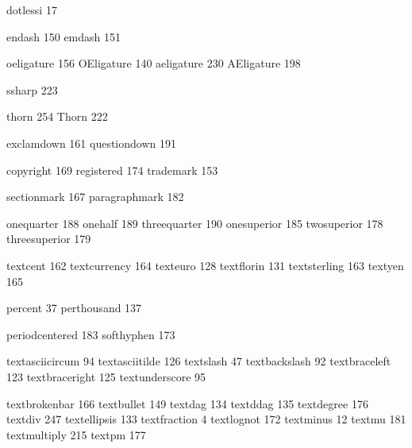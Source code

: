  dotlessi           17

 endash            150
 emdash            151

 oeligature        156
 OEligature        140
 aeligature        230
 AEligature        198

 ssharp            223

 thorn             254
 Thorn             222

 exclamdown        161
 questiondown      191

 copyright         169
 registered        174
 trademark         153

 sectionmark       167
 paragraphmark     182

 onequarter        188
 onehalf           189
 threequarter      190
 onesuperior       185
 twosuperior       178
 threesuperior     179

 textcent          162
 textcurrency      164
 texteuro          128
 textflorin        131
 textsterling      163
 textyen           165

 percent            37
 perthousand       137

 periodcentered    183
 softhyphen        173

 textasciicircum    94
 textasciitilde    126
 textslash          47
 textbackslash      92
 textbraceleft     123
 textbraceright    125
 textunderscore     95

 textbrokenbar     166
 textbullet        149
 textdag           134
 textddag          135
 textdegree        176
 textdiv           247
 textellipsis      133
 textfraction        4
 textlognot        172
 textminus          12
 textmu            181
 textmultiply      215
 textpm            177

